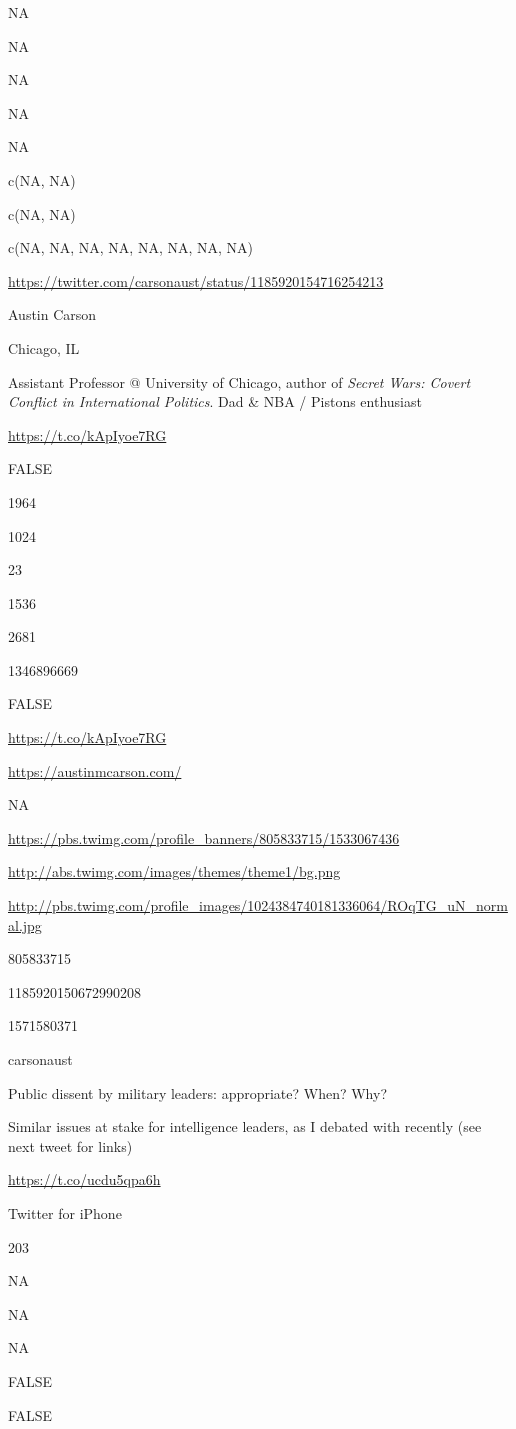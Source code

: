 \documentclass[]{book}
\begin{document}
NA

NA

NA

NA

NA

c(NA, NA)

c(NA, NA)

c(NA, NA, NA, NA, NA, NA, NA, NA)

\url{https://twitter.com/carsonaust/status/1185920154716254213}

Austin Carson

Chicago, IL

Assistant Professor @ University of Chicago, author of \emph{Secret Wars: Covert Conflict in International Politics}. Dad \& NBA / Pistons enthusiast

\url{https://t.co/kApIyoe7RG}

FALSE

1964

1024

23

1536

2681

1346896669

FALSE

\url{https://t.co/kApIyoe7RG}

\url{https://austinmcarson.com/}

NA

\url{https://pbs.twimg.com/profile_banners/805833715/1533067436}

\url{http://abs.twimg.com/images/themes/theme1/bg.png}

\url{http://pbs.twimg.com/profile_images/1024384740181336064/ROqTG_uN_normal.jpg}

805833715

1185920150672990208

1571580371

carsonaust

Public dissent by military leaders: appropriate? When? Why?

Similar issues at stake for intelligence leaders, as I debated with \citet{JoshRovner1} recently (see next tweet for links)

\url{https://t.co/ucdu5qpa6h}

Twitter for iPhone

203

NA

NA

NA

FALSE

FALSE
\end{document}
